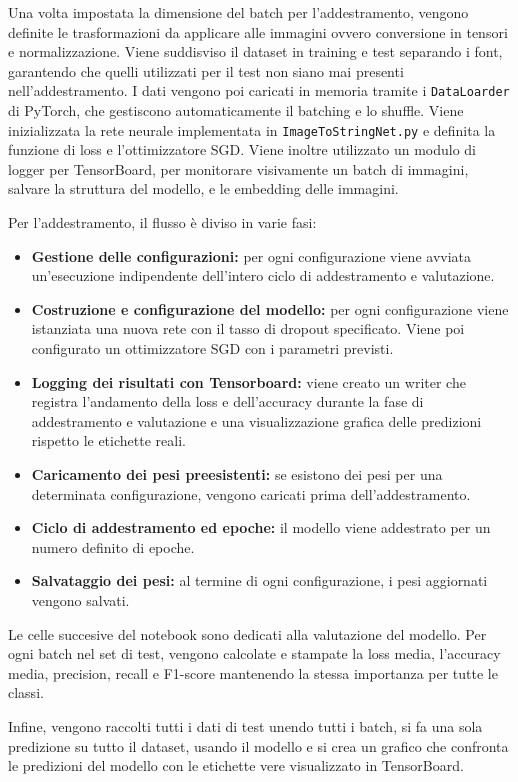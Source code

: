 Una volta impostata la dimensione del batch per l'addestramento, vengono definite le trasformazioni da applicare alle immagini ovvero conversione in tensori e normalizzazione. Viene suddisviso il dataset in training e test separando i font, garantendo che quelli utilizzati per il test non siano mai presenti nell'addestramento. I dati vengono poi caricati in memoria tramite i \texttt{DataLoarder} di PyTorch, che gestiscono automaticamente il batching e lo shuffle. Viene inizializzata la rete neurale implementata in \texttt{ImageToStringNet.py} e definita la funzione di loss e l'ottimizzatore SGD. Viene inoltre utilizzato un modulo di logger per TensorBoard, per monitorare visivamente un batch di immagini, salvare la struttura del modello, e le embedding delle immagini.

Per l'addestramento, il flusso è diviso in varie fasi:
\begin{itemize}
    \item \textbf{Gestione delle configurazioni:} per ogni configurazione viene avviata un'esecuzione indipendente dell'intero ciclo di addestramento e valutazione.
    \item \textbf{Costruzione e configurazione del modello:} per ogni configurazione viene istanziata una nuova rete con il tasso di dropout specificato. Viene poi configurato un ottimizzatore SGD con i parametri previsti.
    \item \textbf{Logging dei risultati con Tensorboard:} viene creato un writer che registra l'andamento della loss e dell'accuracy durante la fase di addestramento e valutazione e una visualizzazione grafica delle predizioni rispetto le etichette reali.
    \item \textbf{Caricamento dei pesi preesistenti:} se esistono dei pesi per una determinata configurazione, vengono caricati prima dell'addestramento.
    \item \textbf{Ciclo di addestramento ed epoche:} il modello viene addestrato per un numero definito di epoche.
    \item \textbf{Salvataggio dei pesi:} al termine di ogni configurazione, i pesi aggiornati vengono salvati.
 \end{itemize}
Le celle succesive del notebook sono dedicati alla valutazione del modello. Per ogni batch nel set di test, vengono calcolate e stampate la loss media, l'accuracy media, precision, recall e F1-score mantenendo la stessa importanza per tutte le classi.

Infine, vengono raccolti tutti i dati di test unendo tutti i batch, si fa una sola predizione su tutto il dataset, usando il modello e si crea un grafico che confronta le predizioni del modello con le etichette vere visualizzato in TensorBoard. 
